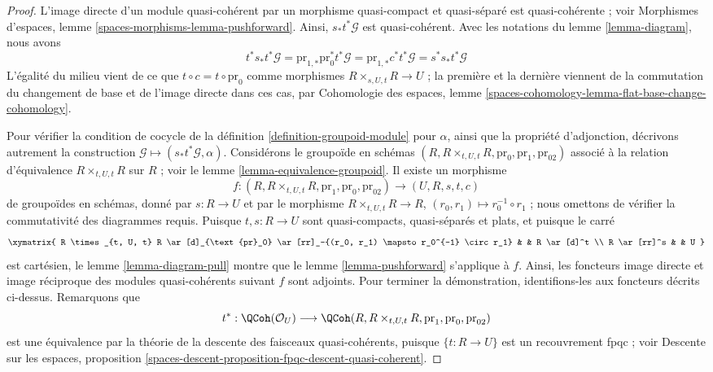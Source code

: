 \begin{proof}
L'image directe d'un module quasi-cohérent par un morphisme quasi-compact et quasi-séparé est quasi-cohérente ; voir Morphismes d'espaces, lemme \ref{spaces-morphisms-lemma-pushforward}. Ainsi, $s_*t^*\mathcal{G}$ est quasi-cohérent. Avec les notations du lemme \ref{lemma-diagram}, nous avons
$$
t^*s_*t^*\mathcal{G} =
\text{pr}_{1, *}\text{pr}_0^*t^*\mathcal{G} =
\text{pr}_{1, *}c^*t^*\mathcal{G} =
s^*s_*t^*\mathcal{G}
$$
L'égalité du milieu vient de ce que $t \circ c = t \circ \text{pr}_0$ comme morphismes $R \times_{s, U, t} R \to U$ ; la première et la dernière viennent de la commutation du changement de base et de l'image directe dans ces cas, par Cohomologie des espaces, lemme \ref{spaces-cohomology-lemma-flat-base-change-cohomology}.

\medskip\noindent
Pour vérifier la condition de cocycle de la définition \ref{definition-groupoid-module} pour $\alpha$, ainsi que la propriété d'adjonction, décrivons autrement la construction $\mathcal{G} \mapsto (s_*t^*\mathcal{G}, \alpha)$. Considérons le groupoïde en schémas $(R, R \times_{t, U, t} R, \text{pr}_0, \text{pr}_1, \text{pr}_{02})$ associé à la relation d'équivalence $R \times_{t, U, t} R$ sur $R$ ; voir le lemme \ref{lemma-equivalence-groupoid}. Il existe un morphisme
$$
f :
(R, R \times_{t, U, t} R, \text{pr}_1, \text{pr}_0, \text{pr}_{02})
\longrightarrow
(U, R, s, t, c)
$$
de groupoïdes en schémas, donné par $s : R \to U$ et par le morphisme $R \times_{t, U, t} R \to R$, $(r_0, r_1) \mapsto r_0^{-1} \circ r_1$ ; nous omettons de vérifier la commutativité des diagrammes requis. Puisque $t, s : R \to U$ sont quasi-compacts, quasi-séparés et plats, et puisque le carré
$$
\xymatrix{
R \times_{t, U, t} R \ar[d]_{\text{pr}_0}
\ar[rr]_-{(r_0, r_1) \mapsto r_0^{-1} \circ r_1} & & R \ar[d]^t \\
R \ar[rr]^s & & U
}
$$
est cartésien, le lemme \ref{lemma-diagram-pull} montre que le lemme \ref{lemma-pushforward} s'applique à $f$. Ainsi, les foncteurs image directe et image réciproque des modules quasi-cohérents suivant $f$ sont adjoints. Pour terminer la démonstration, identifions-les aux foncteurs décrits ci-dessus. Remarquons que
$$
t^* :
\QCoh(\mathcal{O}_U)
\longrightarrow
\QCoh(R, R \times_{t, U, t} R, \text{pr}_1, \text{pr}_0, \text{pr}_{02})
$$
est une équivalence par la théorie de la descente des faisceaux quasi-cohérents, puisque $\{t : R \to U\}$ est un recouvrement fpqc ; voir Descente sur les espaces, proposition \ref{spaces-descent-proposition-fpqc-descent-quasi-coherent}.


\end{proof}
